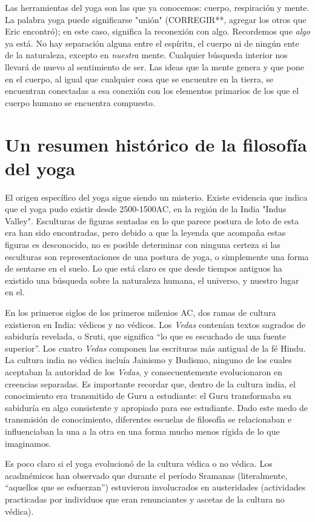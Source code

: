 Las herramientas del yoga son las que ya conocemos: cuerpo, respiración y mente. La palabra yoga puede significarse "unión" (CORREGIR**, agregar los otros que Eric encontró); en este caso, significa la reconexión con algo. Recordemos que \textit{algo} ya está. No hay separación alguna entre el espíritu, el cuerpo ni de ningún ente de la naturaleza, excepto en \textit{nuestra} mente. Cualquier búsqueda interior nos llevará de nuevo al sentimiento de ser. Las ideas que la mente genera y que pone en el cuerpo, al igual que cualquier cosa que se encuentre en la tierra, se encuentran conectadas a esa conexión con los elementos primarios de los que el cuerpo humano se encuentra compuesto.

\section{Un resumen histórico de la filosofía del yoga}
El origen específico del yoga sigue siendo un misterio. Existe evidencia que indica que el yoga pudo existir desde 2500-1500AC, en la región de la India "Indus Valley". Esculturas de figuras sentadas en lo que parece postura de loto de esta era han sido encontradas, pero debido a que la leyenda que acompaña estas figuras es desconocido, no es posible determinar con ninguna certeza si las esculturas son representaciones de una postura de yoga, o simplemente una forma de sentarse en el suelo. Lo que está claro es que desde tiempos antiguos ha existido una búsqueda sobre la naturaleza humana, el universo, y nuestro lugar en el.

En los primeros siglos de los primeros milenios AC, dos ramas de cultura existieron en India: v\'edicos y no v\'edicos. Los \textit{Vedas} contenían textos sagrados de sabiduría revelada, o Sruti, que significa ``lo que es escuchado de una fuente superior''. Los cuatro \textit{Vedas} componen las escrituras más antigual de la f\'e Hindu. La cultura india no v\'edica incluía Jainismo y Budismo, ninguno de los cuales aceptaban la autoridad de los \textit{Vedas}, y consecuentemente evolucionaron en creencias separadas. Es importante recordar que, dentro de la cultura india, el conocimiento era transmitido de Guru a estudiante: el Guru transformaba su sabiduría en algo consistente y apropiado para ese estudiante. Dado este medo de transmisión de conocimiento, diferentes escuelas de filosofía se relacionaban e influenciaban la una a la otra en una forma mucho menos rígida de lo que imaginamos.

Es poco claro si el yoga evolucionó de la cultura v\'edica o no v\'edica. Los acadm\'emicos han observado que durante el período Sramanas (literalmente, ``aquellos que se esfuerzan'') estuvieron involucrados en austeridades (actividades practicadas por individuos que eran renunciantes y ascetas de la cultura no v\'edica).

